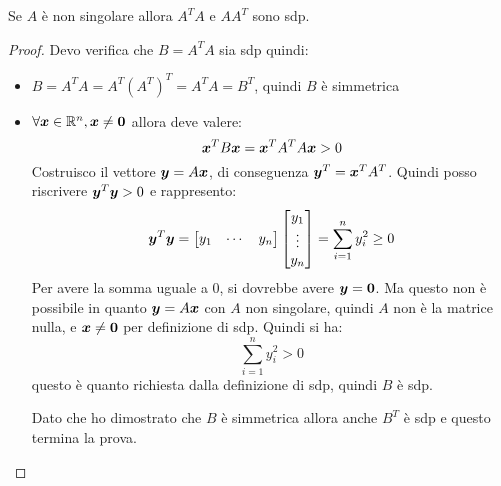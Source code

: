 \begin{exercise}[3.11]
\label{exercise:311}
Se $A$ \`e non singolare allora $A^{T}A$ e $AA^{T}$ sono sdp.
\end{exercise}
\begin{proof}
Devo verifica che $B = A^{T}A$ sia sdp quindi:
\begin{itemize}
  \item $B = A^{T}A = A^{T}(A^{T})^{T} = A^{T}A = B^{T}$, quindi $B$ \`e
  simmetrica
  \item $\forall \boldsymbol{x} \in \mathbb{R}^{n}, \boldsymbol{x} \not = \boldsymbol{0}$ allora
deve valere:
\begin{displaymath}
\boldsymbol{x}^{T}B\boldsymbol{x} = \boldsymbol{x}^{T}A^{T}A\boldsymbol{x} > 0
\end{displaymath}
Costruisco il vettore $\boldsymbol{y} = A\boldsymbol{x}$, di conseguenza $\boldsymbol{y}^{T}
= \boldsymbol{x}^{T}A^{T}$. Quindi posso riscrivere
$\boldsymbol{y}^{T}\boldsymbol{y} > 0$ e rappresento:
\begin{displaymath}
\boldsymbol{y}^{T}\boldsymbol{y} = 
\begin{bmatrix}
y_{1} & \cdots & y_{n}
\end{bmatrix}
\begin{bmatrix}
y_{1}\\
\vdots \\
y_{n}
\end{bmatrix} =
\sum_{i = 1}^{n}{y_{i}^{2}} \geq 0
\end{displaymath} 
Per avere la somma uguale a 0, si dovrebbe
avere $\boldsymbol{y} = \boldsymbol{0}$. Ma questo non \`e possibile in quanto $\boldsymbol{y}  
= A\boldsymbol{x}$ con $A$ non singolare, quindi $A$ non \`e la matrice nulla, e
$\boldsymbol{x} \not = \boldsymbol{0}$ per definizione di sdp. Quindi si ha:
\begin{displaymath}
\sum_{i = 1}^{n}{y_{i}^{2}} > 0
\end{displaymath} 
questo \`e quanto richiesta dalla definizione di sdp, quindi $B$ \`e sdp.

Dato che ho dimostrato che $B$ \`e simmetrica allora anche $B^{T}$ \`e sdp e
questo termina la prova.
\end{itemize}
\end{proof}

